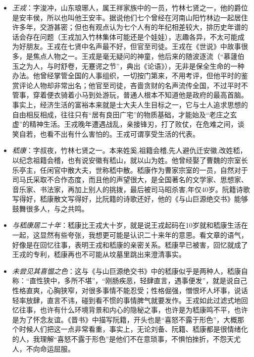 \documentclass[]{book}
\providecommand{\tightlist}{%
  \setlength{\itemsep}{0pt}\setlength{\parskip}{0pt}}
\begin{document}
\begin{itemize}
\tightlist
\item
  \emph{王戎}：字浚冲，山东琅琊人，属王祥家族中的一员，竹林七贤之一，他的爵位是安丰侯，所以也叫他王安丰。据说他们七个曾经在河南山阳竹林边一起居住许多年，交游甚密；但也有观点认为七个人有的年纪相差较大，排历史年谱的话会存在问题（王戎加入竹林集体可能还是个娃娃），志趣各异，不太可能成为好朋友。王戎在七贤中名声最不好，但官至司徒。王戎在《世说》中故事很多，是焦点人物之一。王戎是毫无疑问的神童，他后来的随波逐流（``慕蘧伯玉之为人，与时舒卷，无蹇谔之节''，典出《论语》），无非是保全生命的一种办法。他曾经掌管全国的人事组织，一切按门第来，不用考评，但他平时的鉴赏评论人物却非常出名；他官至司徒，吝啬贪财的名声流传全国，不过平时不管事，穿着便衣骑着小马到处游玩，普通人根本不知道他是政府的最高首脑。事实上，经济生活的富裕本来就是士大夫人生目标之一，它与士人追求思想的自由相反相成，往往只有``居有良田广宅''的物质基础，才能始及``老庄之玄虚''的精神生活。王戎晚年遭遇战乱，亲接锋刃，打了败仗，在危难之间，谈笑自若，也看不出有什么害怕的。王戎可谓享受生活的代表。
\item
  \emph{嵇康}：字叔夜，竹林七贤之一。本来姓奚,祖籍会稽,先人避仇迁安徽,改姓嵇，以纪念祖籍会稽，也有说安徽有嵇山，就以山为姓。他曾经娶了曹魏的宗室长乐亭主，任闲官中散大夫，世称嵇中散。嵇康作为曹家宗室的一员，自然对于司马氏采取不合作态度，而且他的声望很大，是全国著名的文学家、思想家、音乐家、书法家，再加上别人的挑拨，最后被司马昭杀害,年仅40岁。阮籍诗歌写得好，嵇康散文写得好，比阮籍的诗歌还好，他的《与山巨源绝交书》能够鼓舞很多人，与之共鸣。
\item
  \emph{与嵇康居二十年}：嵇康比王戎大十岁，就是说王戎起码在10岁就和嵇康生活在一起，这显然有些夸张，我想更可能是认识二十来年的意思。看文章的语气，好像是在回忆往事，表明王戎和嵇康的亲密关系。嵇康早已被害，回忆就成了王戎的专利，嵇康再也不可能从坟墓里跳出来澄清事实。
\item
  \emph{未尝见其喜愠之色}：这与《与山巨源绝交书》中的嵇康似乎是两种人，嵇康自称：``直性狭中，多所不堪''，``刚肠疾恶，轻肆直言，遇事便发''，就是说自己性格直爽，心胸狭窄，对很多事情不能忍受；性格倔强，憎恨坏人坏事，说话轻率放肆，直言不讳，碰到看不惯的事情脾气就要发作。王戎如此过滤式地回忆往事，也许有什么环境背景和内心的隐秘之事，也许是为嵇康鸣不平，也许是为了怀念友谊。《晋书》中描写阮籍，开头也是``喜怒不露于形色''，大概那个时候人们把这一点非常看重，事实上，无论刘备、阮籍、嵇康都是很情绪化的人，我理解``喜怒不露于形色''是他们不在意琐事，不惧怕挫折，不怨天尤人，不向命运屈服。
\end{itemize}
\end{document}
